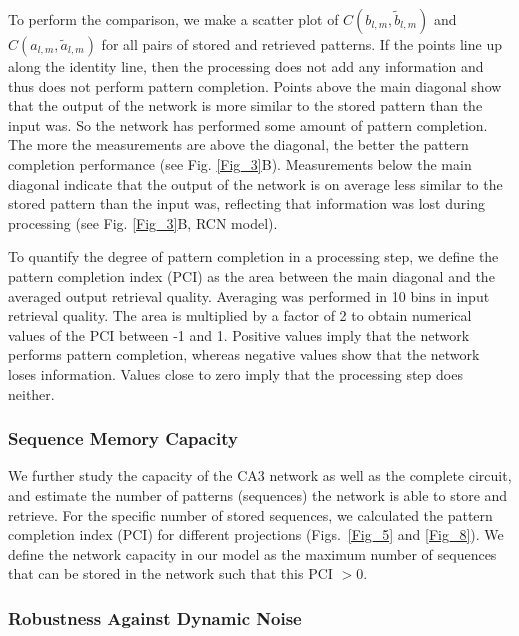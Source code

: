 \documentclass[utf8]{frontiersSCNS} %
\begin{document}
%
To perform the comparison, we make a scatter plot of
$C(b_{l, m},\tilde{b}_{l, m})$ and
$C(a_{l, m},\tilde{a}_{l, m})$ 
for all pairs of stored and retrieved patterns.
If the points line up along the identity line, then the processing does not add any information and thus does not perform pattern completion. Points above the main diagonal show that the output of the network is more similar to the stored pattern than the input was. So the network has performed some amount of pattern completion. The more the measurements are above the diagonal, the better the pattern completion performance (see Fig. \ref{Fig_3}B). Measurements below the main diagonal indicate that the output of the network is on average less similar to the stored pattern than the input was, reflecting that information was lost during processing (see Fig. \ref{Fig_3}B, RCN model).

To quantify the degree of pattern completion in a processing step, we define the pattern completion index (PCI) as the area between the main diagonal and the averaged output retrieval quality. Averaging was performed in 10 bins in input retrieval quality. The area is multiplied by a factor of 2 to obtain numerical values of the PCI between -1 and 1. Positive values imply that the network performs pattern completion, whereas negative values show that the network loses information. Values close to zero imply that the processing step does neither. 

\subsubsection{Sequence Memory Capacity}

We further study the capacity of the CA3 network as well as the complete circuit, and estimate the number of patterns (sequences) the network is able to store and retrieve. For the specific number of stored sequences, we calculated the pattern completion index (PCI) for different projections (Figs.~\ref{Fig_5} and \ref{Fig_8}). 
We define the network capacity in our model as the maximum number of sequences that can be stored in the network such that this PCI $> 0$.

\subsubsection{Robustness Against Dynamic Noise}
\end{document}
